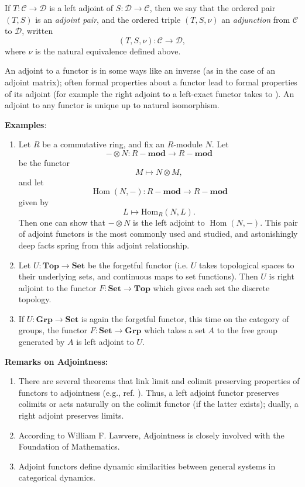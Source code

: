 \documentclass[12pt]{article}
\DeclareMathOperator{\Hom}{Hom}
\begin{document}
If $T:\mathcal{C}\to\mathcal{D}$ is a left adjoint of $S:\mathcal{D}\to \mathcal{C}$, then we say that the ordered pair $(T,S)$ is an \emph{adjoint pair}, and the ordered triple $(T,S,\nu)$ an \emph{adjunction} from $\mathcal{C}$ to $\mathcal{D}$, written $$(T,S,\nu):\mathcal{C}\to \mathcal{D},$$ where $\nu$ is the natural equivalence defined above.  

An adjoint to a functor is in some ways like an inverse (as in the case of an adjoint matrix); often formal properties about a functor lead to formal properties of its adjoint (for example the right adjoint to a left-exact functor takes  to ).  An adjoint to any functor is unique up to natural isomorphism.

\textbf{Examples}:
\begin{enumerate}

\item Let $R$ be a commutative ring, and fix an $R$-module $N$.  Let 
\[
{-\otimes N}\colon {R\! -\!\mathbf{mod}}\to {R\! -\!\mathbf{mod}}
\] 
be the functor 
\[
M\mapsto N\otimes M,
\] 
and let
\[
{\Hom(N,-)}:{R\! -\!\mathbf{mod}}\to {R\! -\!\mathbf{mod}}
\] 
given by 
\[
L\mapsto\mathrm{Hom}_R(N,L).
\]   
Then one can show that ${-\otimes N}$ is the left adjoint to ${\Hom(N,-)}$.  This pair of adjoint functors is the most commonly used and studied, and astonishingly deep facts spring from this adjoint relationship. 

\item Let $U:\mathbf{Top}\to \mathbf{Set}$ be the forgetful functor (i.e. $U$ takes topological spaces to their underlying sets, and continuous maps to set functions). Then $U$ is right adjoint to the functor $F:\mathbf{Set} \to \mathbf{Top}$ which gives each set the discrete topology.

\item If $U:\mathbf{Grp} \to \mathbf{Set}$ is again the forgetful functor, this time on the category of groups, the functor $F: \mathbf{Set} \to \mathbf{Grp}$ which takes a set $A$ to the free group generated by $A$ is left adjoint to $U$.
\end{enumerate}

\textbf{Remarks on Adjointness:}
\begin{enumerate}
\item There are several theorems that link limit and colimit preserving properties
of functors to adjointness (e.g., ref. \cite{NP75}). Thus, a left adjoint functor preserves colimits or acts naturally 
on the colimit functor (if the latter exists); dually, a right adjoint preserves limits.  

\item According to William F. Lawvere, Adjointness is closely involved with the Foundation of Mathematics.

\item Adjoint functors define dynamic similarities between general systems in categorical dynamics.

\end{enumerate}
\end{document}
